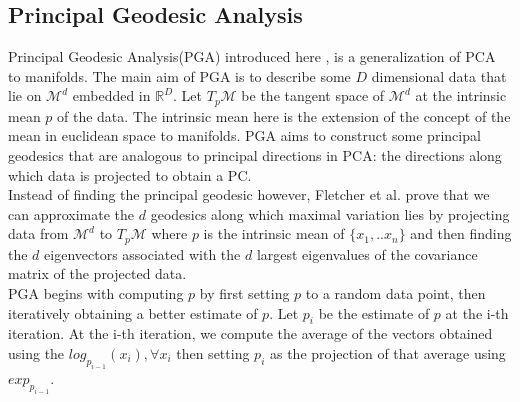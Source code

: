 \documentclass[12pt]{report}
\begin{document}
\subsection{Principal Geodesic Analysis}

Principal Geodesic Analysis(PGA) introduced here \cite{pga}, 
is a generalization of PCA to manifolds. 
The main aim of PGA is to describe some $D$ dimensional data that
lie on $\mathcal{M}^d$ embedded in $\mathbb{R}^D$.
Let $T_p\mathcal{M}$ be the tangent space of $\mathcal{M}^d$ 
at the intrinsic mean $p$ of the data. 
The intrinsic mean here is the extension of the concept 
of the mean in euclidean space to manifolds.
PGA aims to construct some principal geodesics that are analogous
to principal directions in PCA: the directions along which data is
projected to obtain a PC.\\
Instead of finding the principal geodesic however, Fletcher et al. prove that
we can approximate the $d$ geodesics along which maximal variation lies 
by projecting data from $\mathcal{M}^d$ to $T_p\mathcal{M}$ where 
$p$ is the intrinsic mean of $\{x_1,..x_n\}$
and then finding the 
$d$ eigenvectors associated with the $d$ largest eigenvalues of the 
covariance matrix of the projected data.\\
PGA begins with computing $p$ by first setting 
$p$ to a random data point, 
then iteratively obtaining a better estimate of $p$. Let $p_i$ be the 
estimate of $p$ at the i-th iteration.
At the i-th iteration, we compute the average of the vectors obtained 
using the $log_{p_{i-1}}(x_i), \forall x_i$ then setting $p_{i}$ 
as the projection of that average using $exp_{p_{i-1}}$.\\
\end{document}
